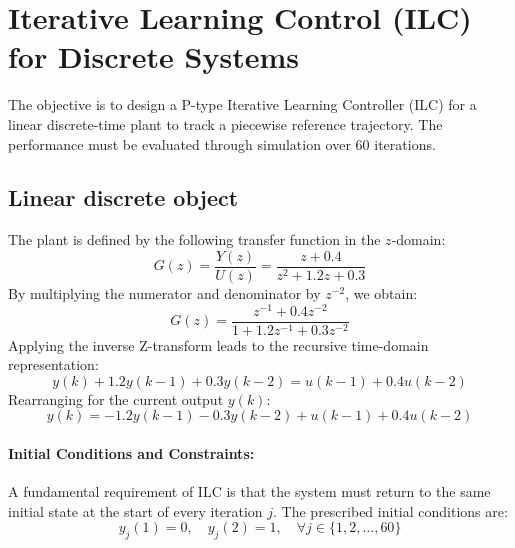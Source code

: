 \section{Iterative Learning Control (ILC) for Discrete Systems}

The objective is to design a P-type Iterative Learning Controller (ILC) for a linear discrete-time plant to track a piecewise reference trajectory. The performance must be evaluated through simulation over 60 iterations.

\subsection{Linear discrete object}
The plant is defined by the following transfer function in the $z$-domain:
\begin{equation}
	G(z) = \frac{Y(z)}{U(z)} = \frac{z + 0.4}{z^2 + 1.2z + 0.3}
	\label{eq:7}
\end{equation}
By multiplying the numerator and denominator by $z^{-2}$, we obtain:
\begin{equation}
	G(z) = \frac{z^{-1} + 0.4z^{-2}}{1 + 1.2z^{-1} + 0.3z^{-2}}
\end{equation}
Applying the inverse Z-transform leads to the recursive time-domain representation:
\begin{equation}
	y(k) + 1.2y(k-1) + 0.3y(k-2) = u(k-1) + 0.4u(k-2)
\end{equation}
Rearranging for the current output $y(k)$:
\begin{equation}
	y(k) = -1.2y(k-1) - 0.3y(k-2) + u(k-1) + 0.4u(k-2)
\end{equation}

\paragraph{Initial Conditions and Constraints:}
A fundamental requirement of ILC is that the system must return to the same initial state at the start of every iteration $j$. The prescribed initial conditions are:
\begin{equation}
	y_j(1) = 0, \quad y_j(2) = 1, \quad \forall j \in \{1, 2, \dots, 60\}
\end{equation}

